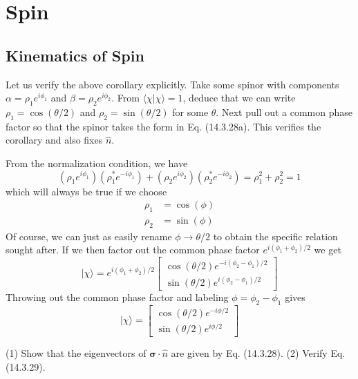 \documentclass[../principles-of-quantum-mechanics.tex]{subfiles}
\begin{document}
	\printanswers
	
	\section{Spin}
	
	\begin{questions}
		\setcounter{subsection}{2}
		\setcounter{question}{0}
		\subsection{Kinematics of Spin}
		\question Let us verify the above corollary explicitly. Take some spinor with components $\alpha = \rho_1e^{i\phi_1}$ and $\beta = \rho_2e^{i\phi_2}$. From $\langle\chi|\chi\rangle = 1$, deduce that we can write $\rho_1=\cos(\theta/2)$ and $\rho_2=\sin(\theta/2)$ for some $\theta$. Next pull out a common phase factor so that the spinor takes the form in Eq. (14.3.28a). This verifies the corollary and also fixes $\hat{n}$.
		
		\begin{solution}
			From the normalization condition, we have
			$$(\rho_1e^{i\phi_1})(\rho_1^*e^{-i\phi_1}) + (\rho_2e^{i\phi_2})(\rho_2^*e^{-i\phi_2}) = \rho_1^2 + \rho_2^2 = 1$$
			which will always be true if we choose
			\begin{align*}
				\rho_1 &= \cos(\phi) \\
				\rho_2 &= \sin(\phi)
			\end{align*}
			Of course, we can just as easily rename $\phi \to \theta/2$ to obtain the specific relation sought after. If we then factor out the common phase factor $e^{i(\phi_1 + \phi_2)/2}$ we get
			$$|\chi\rangle = e^{i(\phi_1 + \phi_2)/2}\begin{bmatrix}
				\cos(\theta/2)e^{-i(\phi_2 - \phi_1)/2} \\
				\sin(\theta/2)e^{i(\phi_2 - \phi_1)/2}
			\end{bmatrix}$$
			Throwing out the common phase factor and labeling $\phi = \phi_2 - \phi_1$ gives
			$$|\chi\rangle = \begin{bmatrix}
				\cos(\theta/2)e^{-i\phi/2} \\
				\sin(\theta/2)e^{i\phi/2}
			\end{bmatrix}$$
		\end{solution}
	
		\question (1) Show that the eigenvectors of $\boldsymbol{\sigma}\cdot\hat{n}$ are given by Eq. (14.3.28). (2) Verify Eq. (14.3.29).
		

\end{questions}
\end{document}
